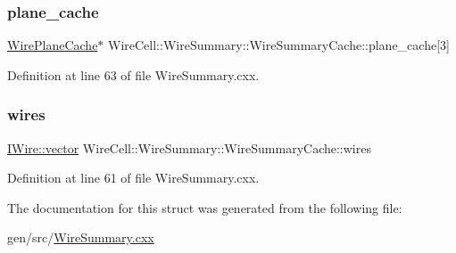 \subsubsection{\texorpdfstring{plane\+\_\+cache}{plane\_cache}}
{\footnotesize\ttfamily \hyperlink{struct_wire_plane_cache}{Wire\+Plane\+Cache}$\ast$ Wire\+Cell\+::\+Wire\+Summary\+::\+Wire\+Summary\+Cache\+::plane\+\_\+cache\mbox{[}3\mbox{]}}



Definition at line 63 of file Wire\+Summary.\+cxx.

\mbox{\label{struct_wire_summary_1_1_wire_summary_cache_a986cfc2dce7cd3843932bb49fdf3a976}} 
\subsubsection{\texorpdfstring{wires}{wires}}
{\footnotesize\ttfamily \hyperlink{class_wire_cell_1_1_i_data_ae1a9f863380499bb43f39fabb6276660}{I\+Wire\+::vector} Wire\+Cell\+::\+Wire\+Summary\+::\+Wire\+Summary\+Cache\+::wires}



Definition at line 61 of file Wire\+Summary.\+cxx.



The documentation for this struct was generated from the following file\+:\begin{DoxyCompactItemize}
\item 
gen/src/\hyperlink{_wire_summary_8cxx}{Wire\+Summary.\+cxx}\end{DoxyCompactItemize}
